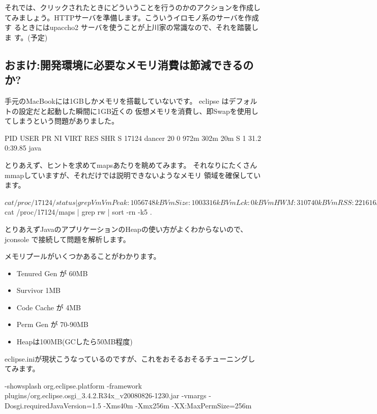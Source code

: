 \documentclass[mingoth,a4paper]{jsarticle}
\begin{document}
\begin{commandline}
それでは、クリックされたときにどういうことを行うのかのアクションを作成し
てみましょう。HTTPサーバを準備します。こういうイロモノ系のサーバを作成す
るときにはupaccho2 サーバを使うことが上川家の常識なので、それを踏襲しま
す。(予定)

\subsection{おまけ:開発環境に必要なメモリ消費は節減できるのか?}

手元のMacBookには1GBしかメモリを搭載していないです。
eclipse はデフォルトの設定だと起動した瞬間に1GB近くの
仮想メモリを消費し、即Swapを使用してしまうという問題がありました。

\begin{commandline}
  PID USER      PR  NI  VIRT  RES  SHR S %
17124 dancer    20   0  972m 302m  20m S    1 31.2   0:39.85 java
\end{commandline}

とりあえず、ヒントを求めてmapsあたりを眺めてみます。
それなりにたくさんmmapしていますが、それだけでは説明できないようなメモリ
領域を確保しています。
\begin{commandline}
$ cat /proc/17124/status | grep Vm
VmPeak:	 1056748 kB
VmSize:	 1003316 kB
VmLck:	       0 kB
VmHWM:	  310740 kB
VmRSS:	  221616 kB
VmData:	  788504 kB
VmStk:	      84 kB
VmExe:	      36 kB
VmLib:	   38812 kB
VmPTE:	    1108 kB
$ cat /proc/17124/maps | grep rw | sort -rn -k5 
 .
\end{commandline}

とりあえずJavaのアプリケーションのHeapの使い方がよくわからないので、
jconsole で接続して問題を解析します。

メモリプールがいくつかあることがわかります。

\begin{itemize}
 \item  Tenured Gen が 60MB
 \item  Survivor 1MB
 \item  Code Cache が 4MB
 \item  Perm Gen が 70-90MB
 \item  Heapは100MB(GCしたら50MB程度)
\end{itemize}

eclipse.iniが現状こうなっているのですが、これをおそるおそるチューニングしてみます。
\begin{commandline}
-showsplash
org.eclipse.platform
-framework
plugins/org.eclipse.osgi_3.4.2.R34x_v20080826-1230.jar
-vmargs
-Dosgi.requiredJavaVersion=1.5
-Xms40m
-Xmx256m
-XX:MaxPermSize=256m
\end{commandline}


\end{commandline}
\end{document}
